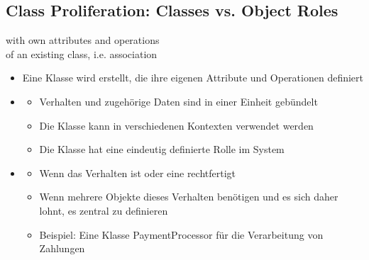 \subsection{Class Proliferation: Classes vs. Object Roles}
\begin{defBox}[title=Two ways to model behavior]
     with own attributes and operations\\
     of an existing class, i.e. association\\
\end{defBox}
\begin{infoBox}[title=Verhalten als eigene Klasse modellieren]
    \begin{itemize}
        \item {} Eine Klasse wird erstellt, die ihre eigenen Attribute und Operationen definiert
        \item {}
        \begin{itemize}
            \item {} Verhalten und zugehörige Daten sind in einer Einheit gebündelt
            \item {} Die Klasse kann in verschiedenen Kontexten verwendet werden
            \item {} Die Klasse hat eine eindeutig definierte Rolle im System
        \end{itemize} 
        \item {}
        \begin{itemize}
            \item Wenn das Verhalten  ist oder eine  rechtfertigt
            \item Wenn mehrere Objekte dieses Verhalten benötigen und es sich daher lohnt, es zentral zu definieren
            \item Beispiel: Eine Klasse PaymentProcessor für die Verarbeitung von Zahlungen
        \end{itemize}
    \end{itemize}
\end{infoBox}
